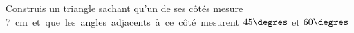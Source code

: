 %
%
	Construis un triangle sachant qu’un de ses côtés mesure \SI{7}cm et que les angles adjacents à ce côté mesurent $45 \degres$ et $60\degres$
